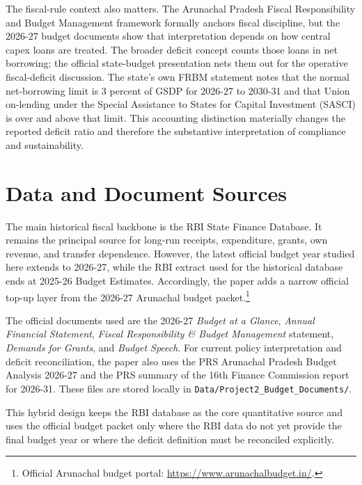 \documentclass[11pt,a4paper]{article}
\begin{document}
The fiscal-rule context also matters. The Arunachal Pradesh Fiscal Responsibility and Budget Management framework formally anchors fiscal discipline, but the 2026-27 budget documents show that interpretation depends on how central capex loans are treated. The broader deficit concept counts those loans in net borrowing; the official state-budget presentation nets them out for the operative fiscal-deficit discussion. The state's own FRBM statement notes that the normal net-borrowing limit is 3 percent of GSDP for 2026-27 to 2030-31 and that Union on-lending under the Special Assistance to States for Capital Investment (SASCI) is over and above that limit. This accounting distinction materially changes the reported deficit ratio and therefore the substantive interpretation of compliance and sustainability.

\section{Data and Document Sources}

The main historical fiscal backbone is the RBI State Finance Database. It remains the principal source for long-run receipts, expenditure, grants, own revenue, and transfer dependence. However, the latest official budget year studied here extends to 2026-27, while the RBI extract used for the historical database ends at 2025-26 Budget Estimates. Accordingly, the paper adds a narrow official top-up layer from the 2026-27 Arunachal budget packet.\footnote{Official Arunachal budget portal: \url{https://www.arunachalbudget.in/}.}

The official documents used are the 2026-27 \emph{Budget at a Glance}, \emph{Annual Financial Statement}, \emph{Fiscal Responsibility \& Budget Management} statement, \emph{Demands for Grants}, and \emph{Budget Speech}. For current policy interpretation and deficit reconciliation, the paper also uses the PRS Arunachal Pradesh Budget Analysis 2026-27 and the PRS summary of the 16th Finance Commission report for 2026-31. These files are stored locally in \texttt{Data/Project2\_Budget\_Documents/}.

This hybrid design keeps the RBI database as the core quantitative source and uses the official budget packet only where the RBI data do not yet provide the final budget year or where the deficit definition must be reconciled explicitly.
\end{document}
